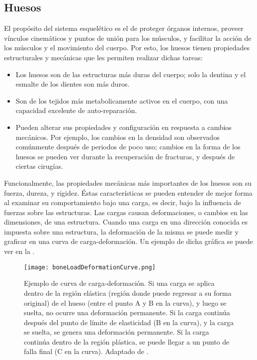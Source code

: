 \subsection{Huesos}

El propósito del sistema esquelético es el de proteger órganos internos, proveer vínculos cinemáticos y puntos de unión para los músculos, y facilitar la acción de los músculos y el movimiento del cuerpo. Por esto, los huesos tienen propiedades estructurales y mecánicas que les permiten realizar dichas tareas:

\begin{itemize}
	\item Los huesos son de las estructuras más duras del cuerpo; solo la dentina y el esmalte de los dientes son más duros.
	\item Son de los tejidos más metabolicamente activos en el cuerpo, con una capacidad excelente de auto-reparación.
	\item Pueden alterar sus propiedades y configuración en respuesta a cambios mecánicos. Por ejemplo, los cambios en la densidad son observados comúnmente después de periodos de poco uso; cambios en la forma de los huesos se pueden ver durante la recuperación de fracturas, y después de ciertas cirugías.
\end{itemize} 

Funcionalmente, las propiedades mecánicas más importantes de los huesos son su fuerza, dureza, y rigidez. Éstas características se pueden entender de mejor forma al examinar su comportamiento bajo una carga, es decir, bajo la influencia de fuerzas sobre las estructuras. Las cargas causan deformaciones, o cambios en las dimensiones, de una estructura. Cuando una carga en una dirección conocida es impuesta sobre una estructura, la deformación de la misma se puede medir y graficar en una curva de carga-deformación. Un ejemplo de dicha gráfica se puede ver en la .

\begin{figure}[!ht]
	\centering
		\texttt{[image: boneLoadDeformationCurve.png]}
	\caption[Ejemplo de curva de carga-deformación.]{Ejemplo de curva de carga-deformación. Si una carga se aplica dentro de la región elástica (región donde puede regresar a su forma original) de el hueso (entre el punto A y B en la curva), y luego se suelta, no ocurre una deformación permanente. Si la carga continúa después del punto de límite de elasticidad (B en la curva), y la carga se suelta, se genera una deformación permanente. Si la carga continúa dentro de la región plástica, se puede llegar a un punto de falla final (C en la curva). Adaptado de \citep{biomechanics2012nordin}.}
	\label{fig:boneLoadDeformationCurve}
\end{figure}

